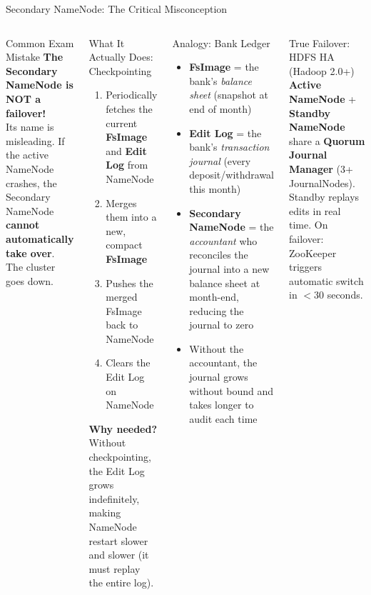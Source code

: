 \documentclass[aspectratio=169,10pt]{beamer}
\begin{document}
\begin{frame}{Secondary NameNode: The Critical Misconception}
  \begin{columns}[T]
      \begin{alertblock}{Common Exam Mistake}
        \textbf{The Secondary NameNode is NOT a failover!}\\[4pt]
        Its name is misleading.  If the active NameNode crashes, the Secondary NameNode \textbf{cannot automatically take over}.  The cluster goes down.
      \end{alertblock}
      \vspace{6pt}
      \begin{block}{What It Actually Does: Checkpointing}
        \begin{enumerate}
          \item Periodically fetches the current \textbf{FsImage} and \textbf{Edit Log} from NameNode
          \item Merges them into a new, compact \textbf{FsImage}
          \item Pushes the merged FsImage back to NameNode
          \item Clears the Edit Log on NameNode
        \end{enumerate}
        \vspace{4pt}
        \textbf{Why needed?}  Without checkpointing, the Edit Log grows indefinitely, making NameNode restart slower and slower (it must replay the entire log).
      \end{block}

      \begin{exampleblock}{Analogy: Bank Ledger}
        \small
        \begin{itemize}
          \item \textbf{FsImage} = the bank's \emph{balance sheet} (snapshot at end of month)
          \item \textbf{Edit Log} = the bank's \emph{transaction journal} (every deposit/withdrawal this month)
          \item \textbf{Secondary NameNode} = the \emph{accountant} who reconciles the journal into a new balance sheet at month-end, reducing the journal to zero
          \item Without the accountant, the journal grows without bound and takes longer to audit each time
        \end{itemize}
      \end{exampleblock}
      \vspace{4pt}
      \begin{block}{True Failover: HDFS HA (Hadoop 2.0+)}
        \small \textbf{Active NameNode} + \textbf{Standby NameNode} share a \textbf{Quorum Journal Manager} (3+ JournalNodes).  Standby replays edits in real time.  On failover: ZooKeeper triggers automatic switch in $<$30 seconds.
      \end{block}
  \end{columns}
\end{frame}
\end{document}
